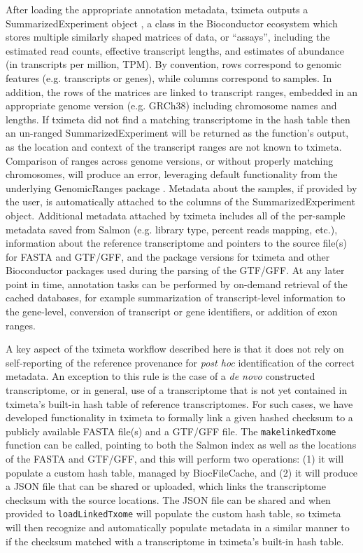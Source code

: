 \documentclass[12pt]{article}
\begin{document}
After loading the appropriate annotation metadata, tximeta outputs a SummarizedExperiment object \citep{granges}, a class in the Bioconductor ecosystem which stores multiple similarly shaped matrices of data, or ``assays'', including the estimated read counts, effective transcript lengths, and estimates of abundance (in transcripts per million, TPM). By convention, rows correspond to genomic features (e.g. transcripts or genes), while columns correspond to samples. In addition, the rows of the matrices are linked to transcript ranges, embedded in an appropriate genome version (e.g. GRCh38) including chromosome names and lengths. If tximeta did not find a matching transcriptome in the hash table then an un-ranged SummarizedExperiment will be returned as the function's output, as the location and context of the transcript ranges are not known to tximeta. Comparison of ranges across genome versions, or without properly matching chromosomes, will produce an error, leveraging default functionality from the underlying GenomicRanges package \citep{granges}. Metadata about the samples, if provided by the user, is automatically attached to the columns of the SummarizedExperiment object. Additional metadata attached by tximeta includes all of the per-sample metadata saved from Salmon (e.g. library type, percent reads mapping, etc.), information about the reference transcriptome and pointers to the source file(s) for FASTA and GTF/GFF, and the package versions for tximeta and other Bioconductor packages used during the parsing of the GTF/GFF. At any later point in time, annotation tasks can be performed by on-demand retrieval of the cached databases, for example summarization of transcript-level information to the gene-level, conversion of transcript or gene identifiers, or addition of exon ranges.

A key aspect of the tximeta workflow described here is that it does not rely on self-reporting of the reference provenance for \textit{post hoc} identification of the correct metadata. An exception to this rule is the case of a \textit{de novo} constructed transcriptome, or in general, use of a transcriptome that is not yet contained in tximeta's built-in hash table of reference transcriptomes. For such cases, we have developed functionality in tximeta to formally link a given hashed checksum to a publicly available FASTA file(s) and a GTF/GFF file. The \texttt{makelinkedTxome} function can be called, pointing to both the Salmon index as well as the locations of the FASTA and GTF/GFF, and this will perform two operations: (1) it will populate a custom hash table, managed by BiocFileCache, and (2) it will produce a JSON file that can be shared or uploaded, which links the transcriptome checksum with the source locations. The JSON file can be shared and when provided to \texttt{loadLinkedTxome} will populate the custom hash table, so tximeta will then recognize and automatically populate metadata in a similar manner to if the checksum matched with a transcriptome in tximeta's built-in hash table.
\end{document}

